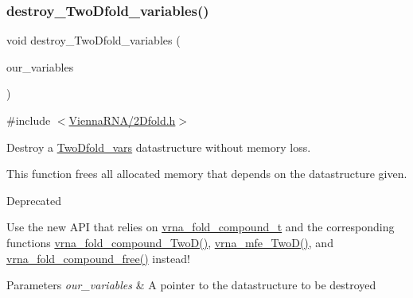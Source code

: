 \subsubsection{\texorpdfstring{destroy\+\_\+\+Two\+Dfold\+\_\+variables()}{destroy\_TwoDfold\_variables()}}
{\footnotesize\ttfamily void destroy\+\_\+\+Two\+Dfold\+\_\+variables (\begin{DoxyParamCaption}\item[{\mbox{\hyperlink{group__kl__neighborhood__mfe_struct_two_dfold__vars}{Two\+Dfold\+\_\+vars}} $\ast$}]{our\+\_\+variables }\end{DoxyParamCaption})}



{\ttfamily \#include $<$\mbox{\hyperlink{2_dfold_8h}{Vienna\+R\+N\+A/2\+Dfold.\+h}}$>$}



Destroy a \mbox{\hyperlink{group__kl__neighborhood__mfe_struct_two_dfold__vars}{Two\+Dfold\+\_\+vars}} datastructure without memory loss. 

This function free\textquotesingle{}s all allocated memory that depends on the datastructure given.

\begin{DoxyRefDesc}{Deprecated}
\item[\mbox{\hyperlink{deprecated__deprecated000003}{Deprecated}}]Use the new A\+PI that relies on \mbox{\hyperlink{group__fold__compound_ga1b0cef17fd40466cef5968eaeeff6166}{vrna\+\_\+fold\+\_\+compound\+\_\+t}} and the corresponding functions \mbox{\hyperlink{group__fold__compound_ga9d24b196753b4f9f03774f11661510f5}{vrna\+\_\+fold\+\_\+compound\+\_\+\+Two\+D()}}, \mbox{\hyperlink{group__kl__neighborhood__mfe_ga243c288b463147352829df04de6a2f77}{vrna\+\_\+mfe\+\_\+\+Two\+D()}}, and \mbox{\hyperlink{group__fold__compound_gadded6039d63f5d6509836e20321534ad}{vrna\+\_\+fold\+\_\+compound\+\_\+free()}} instead!\end{DoxyRefDesc}



\begin{DoxyParams}{Parameters}
{\em our\+\_\+variables} & A pointer to the datastructure to be destroyed \\
\hline
\end{DoxyParams}
\mbox{\label{group__kl__neighborhood__mfe_ga7fc5e3e92fe97914ca4eccd33c01c2a7}} 
